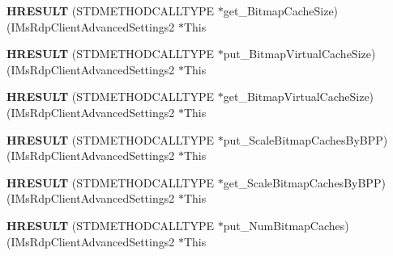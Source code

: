 \begin{DoxyCompactItemize}
\item 
\mbox{\label{struct_i_ms_rdp_client_advanced_settings2_vtbl_aca5f076302d276adfef334bdf66eaf28}} 
{\bfseries H\+R\+E\+S\+U\+LT} (S\+T\+D\+M\+E\+T\+H\+O\+D\+C\+A\+L\+L\+T\+Y\+PE $\ast$get\+\_\+\+Bitmap\+Cache\+Size)(I\+Ms\+Rdp\+Client\+Advanced\+Settings2 $\ast$This
\item 
\mbox{\label{struct_i_ms_rdp_client_advanced_settings2_vtbl_a039f283e803a05cc85df021a0dd510e8}} 
{\bfseries H\+R\+E\+S\+U\+LT} (S\+T\+D\+M\+E\+T\+H\+O\+D\+C\+A\+L\+L\+T\+Y\+PE $\ast$put\+\_\+\+Bitmap\+Virtual\+Cache\+Size)(I\+Ms\+Rdp\+Client\+Advanced\+Settings2 $\ast$This
\item 
\mbox{\label{struct_i_ms_rdp_client_advanced_settings2_vtbl_a106b8da81b31c99a111e6b784be063b5}} 
{\bfseries H\+R\+E\+S\+U\+LT} (S\+T\+D\+M\+E\+T\+H\+O\+D\+C\+A\+L\+L\+T\+Y\+PE $\ast$get\+\_\+\+Bitmap\+Virtual\+Cache\+Size)(I\+Ms\+Rdp\+Client\+Advanced\+Settings2 $\ast$This
\item 
\mbox{\label{struct_i_ms_rdp_client_advanced_settings2_vtbl_af36077ca16e474e72d2243059e4e19e0}} 
{\bfseries H\+R\+E\+S\+U\+LT} (S\+T\+D\+M\+E\+T\+H\+O\+D\+C\+A\+L\+L\+T\+Y\+PE $\ast$put\+\_\+\+Scale\+Bitmap\+Caches\+By\+B\+PP)(I\+Ms\+Rdp\+Client\+Advanced\+Settings2 $\ast$This
\item 
\mbox{\label{struct_i_ms_rdp_client_advanced_settings2_vtbl_afee40966d6cdeabdb1b773ed841bcf9a}} 
{\bfseries H\+R\+E\+S\+U\+LT} (S\+T\+D\+M\+E\+T\+H\+O\+D\+C\+A\+L\+L\+T\+Y\+PE $\ast$get\+\_\+\+Scale\+Bitmap\+Caches\+By\+B\+PP)(I\+Ms\+Rdp\+Client\+Advanced\+Settings2 $\ast$This
\item 
\mbox{\label{struct_i_ms_rdp_client_advanced_settings2_vtbl_ad8d880eef450f203ae987fd8f20813bd}} 
{\bfseries H\+R\+E\+S\+U\+LT} (S\+T\+D\+M\+E\+T\+H\+O\+D\+C\+A\+L\+L\+T\+Y\+PE $\ast$put\+\_\+\+Num\+Bitmap\+Caches)(I\+Ms\+Rdp\+Client\+Advanced\+Settings2 $\ast$This
\item 
\mbox{\label{struct_i_ms_rdp_client_advanced_settings2_vtbl_a17f2940a7e8ea17c9e679a1cb39da5b5}} 

\end{DoxyCompactItemize}
